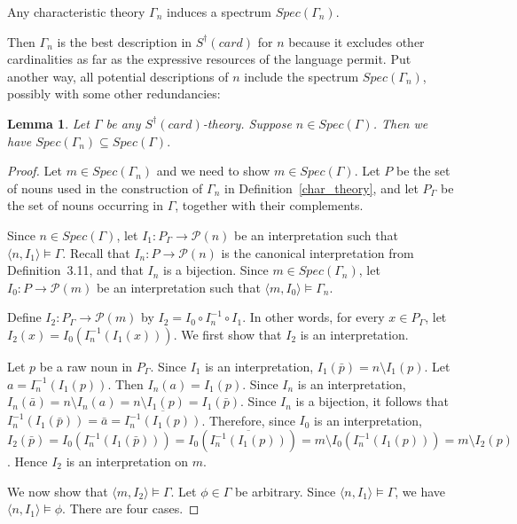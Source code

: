 \documentclass[12pt, reqno]{amsart}
\newtheorem{lemma}[theorem]{Lemma}
\theoremstyle{definition}
\theoremstyle{remark}
\numberwithin{equation}{section}
\begin{document}
Any characteristic theory $\Gamma_n$ induces a spectrum $Spec(\Gamma_n)$.

Then $\Gamma_n$ is the best description in $S^{\dagger}(card)$ for $n$ because it excludes other cardinalities as far as the expressive resources of the language permit. Put another way, all potential descriptions of $n$ include the spectrum $Spec(\Gamma_n)$, possibly with some other redundancies: 

\begin{lemma}\label{smallest}
Let $\Gamma$ be any $S^\dagger(card)$-theory. Suppose $n\in Spec(\Gamma)$. Then we have $Spec(\Gamma_n)
\subseteq Spec(\Gamma).$
\end{lemma}


\begin{proof}

Let $m \in Spec(\Gamma_n)$ and we need to show $m \in Spec(\Gamma)$. Let $P$ be the set of nouns used in the construction of $\Gamma_n$ in Definition~\ref{char_theory}, and let $P_\Gamma$ be the set of nouns occurring in $\Gamma$, together with their complements.

Since $n \in Spec(\Gamma)$, let $I_1:P_\Gamma \to \mathcal P(n)$ be an interpretation such that $\langle n,I_1\rangle \models \Gamma$. Recall that $I_n:P\to\mathcal P(n)$ is the canonical interpretation from Definition~3.11, and that $I_n$ is a bijection. Since $m \in Spec(\Gamma_n)$, let $I_0:P\to\mathcal P(m)$ be an interpretation such that $\langle m,I_0\rangle \models \Gamma_n$.

Define $I_2:P_\Gamma\to\mathcal P(m)$ by $I_2=I_0\circ I_n^{-1}\circ I_1$. In other words, for every $x\in P_\Gamma$, let $I_2(x)=I_0(I_n^{-1}(I_1(x)))$. We first show that $I_2$ is an interpretation.

Let $p$ be a raw noun in $P_\Gamma$. Since $I_1$ is an interpretation, $I_1(\bar p)=n\setminus I_1(p)$. Let $a=I_n^{-1}(I_1(p))$. Then $I_n(a)=I_1(p)$. Since $I_n$ is an interpretation, $I_n(\bar a)=n\setminus I_n(a)=n\setminus I_1(p)=I_1(\bar p)$. Since $I_n$ is a bijection, it follows that $I_n^{-1}(I_1(\bar p))=\bar a=\overline{I_n^{-1}(I_1(p))}$. Therefore, since $I_0$ is an interpretation, $I_2(\bar p)=I_0(I_n^{-1}(I_1(\bar p)))=I_0(\overline{I_n^{-1}(I_1(p))})=m\setminus I_0(I_n^{-1}(I_1(p)))=m\setminus I_2(p)$. Hence $I_2$ is an interpretation on $m$.

We now show that $\langle m,I_2\rangle\models\Gamma$. Let $\phi\in\Gamma$ be arbitrary. Since $\langle n,I_1\rangle\models\Gamma$, we have $\langle n,I_1\rangle\models\phi$. There are four cases.


\end{proof}
\end{document}
